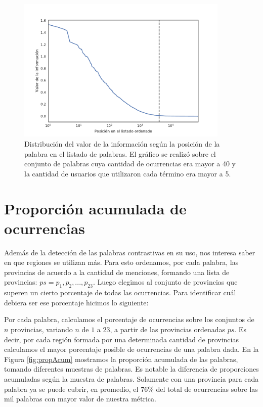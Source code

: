 \begin{figure}
\centering
\includegraphics[width=0.9\textwidth]{./images/train/conFiltro/valorInformacionCorte.pdf}
\caption{Distribución del valor de la información según la posición de la palabra en el listado de palabras. El gráfico se realizó sobre el conjunto de palabras cuya cantidad de ocurrencias era mayor a 40 y la cantidad de usuarios que utilizaron cada término era mayor a 5. } 
\label{fig:ivalue}
\end{figure}


\section{Proporción acumulada de ocurrencias} %
\label{proporcionDeOcurrencias}
Además de la detección de las palabras contrastivas en su uso, nos interesa saber en que regiones se utilizan más. Para esto ordenamos, por cada palabra, las provincias de acuerdo a la cantidad de menciones, formando una lista de provincias: $ps = p_1,p_2,...,p_{23}$. Luego elegimos al conjunto de provincias que superen un cierto porcentaje de todas las ocurrencias. Para identificar cuál debiera ser ese porcentaje hicimos lo siguiente:

Por cada palabra, calculamos el porcentaje de ocurrencias sobre los conjuntos de $n$ provincias, variando $n$ de $1$ a $23$, a partir de las provincias ordenadas $ps$. Es decir, por cada región formada por una determinada cantidad de provincias calculamos el mayor porcentaje posible de ocurrencias de una palabra dada.
En la Figura \ref{fig:propAcum} mostramos la proporción acumulada de las palabras, tomando diferentes muestras de palabras. Es notable la diferencia de proporciones acumuladas según la muestra de palabras. Solamente con una provincia para cada palabra ya se puede cubrir, en promedio, el 76\% del total de ocurrencias sobre las mil palabras con mayor valor de nuestra métrica.

